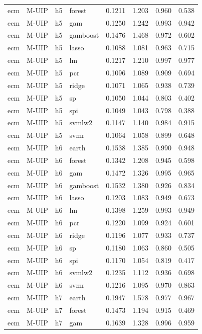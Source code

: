 \begin{ThreePartTable}
\begin{longtable}[t]{llclcccc}
ecm & M-UIP & h5 & forest & 0.1211 & 1.203 & 0.960 & 0.538\\
ecm & M-UIP & h5 & gam & 0.1250 & 1.242 & 0.993 & 0.942\\
ecm & M-UIP & h5 & gamboost & 0.1476 & 1.468 & 0.972 & 0.602\\
ecm & M-UIP & h5 & lasso & 0.1088 & 1.081 & 0.963 & 0.715\\
ecm & M-UIP & h5 & lm & 0.1217 & 1.210 & 0.997 & 0.977\\
ecm & M-UIP & h5 & pcr & 0.1096 & 1.089 & 0.909 & 0.694\\
ecm & M-UIP & h5 & ridge & 0.1071 & 1.065 & 0.938 & 0.739\\
ecm & M-UIP & h5 & sp & 0.1050 & 1.044 & 0.803 & 0.402\\
ecm & M-UIP & h5 & spi & 0.1049 & 1.043 & 0.798 & 0.388\\
ecm & M-UIP & h5 & svmlw2 & 0.1147 & 1.140 & 0.984 & 0.915\\
ecm & M-UIP & h5 & svmr & 0.1064 & 1.058 & 0.899 & 0.648\\
\addlinespace
ecm & M-UIP & h6 & earth & 0.1538 & 1.385 & 0.990 & 0.948\\
ecm & M-UIP & h6 & forest & 0.1342 & 1.208 & 0.945 & 0.598\\
ecm & M-UIP & h6 & gam & 0.1472 & 1.326 & 0.995 & 0.965\\
ecm & M-UIP & h6 & gamboost & 0.1532 & 1.380 & 0.926 & 0.834\\
ecm & M-UIP & h6 & lasso & 0.1203 & 1.083 & 0.949 & 0.673\\
ecm & M-UIP & h6 & lm & 0.1398 & 1.259 & 0.993 & 0.949\\
ecm & M-UIP & h6 & pcr & 0.1220 & 1.099 & 0.924 & 0.601\\
ecm & M-UIP & h6 & ridge & 0.1196 & 1.077 & 0.933 & 0.737\\
ecm & M-UIP & h6 & sp & 0.1180 & 1.063 & 0.860 & 0.505\\
ecm & M-UIP & h6 & spi & 0.1170 & 1.054 & 0.819 & 0.417\\
ecm & M-UIP & h6 & svmlw2 & 0.1235 & 1.112 & 0.936 & 0.698\\
ecm & M-UIP & h6 & svmr & 0.1216 & 1.095 & 0.970 & 0.863\\
\addlinespace
ecm & M-UIP & h7 & earth & 0.1947 & 1.578 & 0.977 & 0.967\\
ecm & M-UIP & h7 & forest & 0.1473 & 1.194 & 0.915 & 0.469\\
ecm & M-UIP & h7 & gam & 0.1639 & 1.328 & 0.996 & 0.959\\

\end{longtable}
\end{ThreePartTable}
